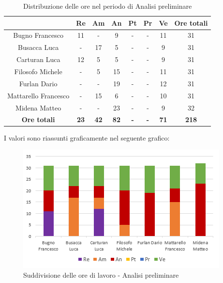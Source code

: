 \begin{table}[H]
    \centering
    \renewcommand{\arraystretch}{1.8}
    \begin{tabular}{c|c|c|c|c|c|c|c}
      \rowcolor[HTML]{125E28} 
      \multicolumn{1}{c}{\color[HTML]{FFFFFF}\textbf{ Nominativo }}
      & \multicolumn{1}{c}{\color[HTML]{FFFFFF}\textbf{ Re }}
      & \multicolumn{1}{c}{\color[HTML]{FFFFFF}\textbf{ Am}}
      & \multicolumn{1}{c}{\color[HTML]{FFFFFF}\textbf{ An }}
      & \multicolumn{1}{c}{\color[HTML]{FFFFFF}\textbf{ Pt }}
      & \multicolumn{1}{c}{\color[HTML]{FFFFFF}\textbf{ Pr }}
      & \multicolumn{1}{c}{\color[HTML]{FFFFFF}\textbf{ Ve }}
      & \multicolumn{1}{c}{\color[HTML]{FFFFFF}\textbf{ Ore totali }}\\
      \hline
      Bugno Francesco       & 11    & -     & 9     & - & - & 11    & 31\\
      Busacca Luca          & -     & 17    & 5     & - & - & 9     & 31\\
      Carturan Luca         & 12    & 5     & 5     & - & - & 9     & 31\\
      Filosofo Michele      & -     & 5     & 15    & - & - & 11    & 31\\
      Furlan Dario          & -     & -     & 19    & - & - & 12    & 31\\
      Mattarello Francesco  & -     & 15    & 6     & - & - & 10    & 31\\
      Midena Matteo         & -     & -     & 23    & - & - & 9     & 32\\
      \textbf{Ore totali} & \textbf{23} & \textbf{42} & \textbf{82} & \textbf{-} & \textbf{-} & \textbf{71} & \textbf{218}
    \end{tabular}
    \caption{Distribuzione delle ore nel periodo di Analisi preliminare}
  \end{table}

I valori sono riassunti graficamente nel seguente grafico:

\begin{figure}[H]
    \centering
     \includegraphics[scale=1.2]{immagini/ore_lavoro_analisi.png}
     \caption{Suddivisione delle ore di lavoro - Analisi preliminare}
   \end{figure}

